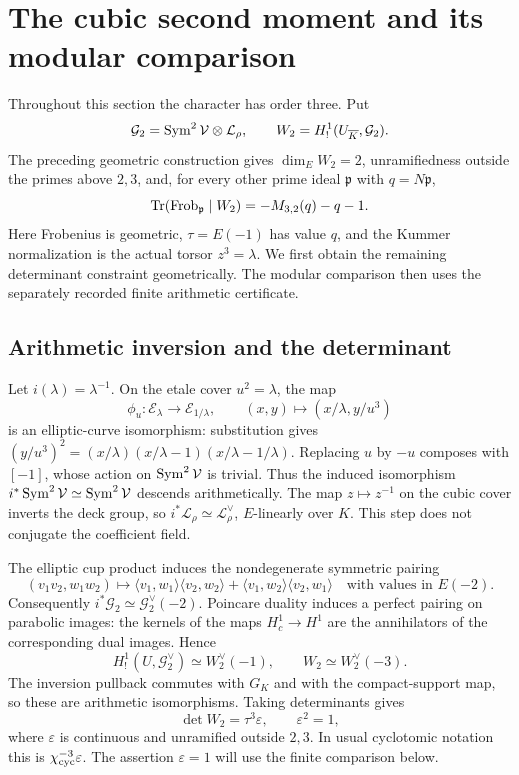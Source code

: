 \section{The cubic second moment and its modular comparison}\label{sec:cubic}
Throughout this section the character has order three. Put
\[
 \mathcal G_2=\operatorname{Sym}^2\mathcal V\otimes\mathcal L_\rho,
 \qquad W_2=H^1_!(U_{\overline K},\mathcal G_2).
\]
The preceding geometric construction gives $\dim_EW_2=2$, unramifiedness
outside the primes above $2,3$, and, for every other prime ideal
$\mathfrak p$ with $q=N\mathfrak p$,
\begin{equation}\label{eq:cubic-trace}
 \operatorname{Tr}(\operatorname{Frob}_{\mathfrak p}\mid W_2)=-M_{3,2}(q)-q-1.
\end{equation}
Here Frobenius is geometric, $\tau=E(-1)$ has value $q$, and the Kummer
normalization is the actual torsor $z^3=\lambda$. We first obtain the
remaining determinant constraint geometrically. The modular comparison
then uses the separately recorded finite arithmetic certificate.

\subsection{Arithmetic inversion and the determinant}
Let $i(\lambda)=\lambda^{-1}$. On the etale cover $u^2=\lambda$, the map
\[
 \phi_u:\mathcal E_\lambda\longrightarrow\mathcal E_{1/\lambda},
 \qquad (x,y)\longmapsto (x/\lambda,y/u^3)
\]
is an elliptic-curve isomorphism: substitution gives
$(y/u^3)^2=(x/\lambda)(x/\lambda-1)(x/\lambda-1/\lambda)$.
Replacing $u$ by $-u$ composes with $[-1]$, whose action on
$\operatorname{Sym}^2\mathcal V$ is trivial. Thus the induced isomorphism
$i^*\operatorname{Sym}^2\mathcal V\simeq\operatorname{Sym}^2\mathcal V$ descends arithmetically.
The map $z\mapsto z^{-1}$ on the cubic cover inverts the deck group,
so $i^*\mathcal L_\rho\simeq\mathcal L_\rho^\vee$, $E$-linearly over $K$.
This step does not conjugate the coefficient field.

The elliptic cup product induces the nondegenerate symmetric pairing
\[
 (v_1v_2,w_1w_2)\longmapsto
 \langle v_1,w_1\rangle\langle v_2,w_2\rangle+
 \langle v_1,w_2\rangle\langle v_2,w_1\rangle
 \quad\text{with values in }E(-2).
\]
Consequently $i^*\mathcal G_2\simeq\mathcal G_2^\vee(-2)$.
Poincare duality \cite[Theorem 24.1]{Milne} induces a perfect pairing
on parabolic images: the kernels of the maps $H_c^1\to H^1$ are the
annihilators of the corresponding dual images. Hence
\[
 H^1_!(U,\mathcal G_2^\vee)\simeq W_2^\vee(-1),
 \qquad W_2\simeq W_2^\vee(-3).
\]
The inversion pullback commutes with $G_K$ and with the compact-support
map, so these are arithmetic isomorphisms. Taking determinants gives
\begin{equation}\label{eq:cubic-det-sign}
 \det W_2=\tau^3\varepsilon,\qquad \varepsilon^2=1,
\end{equation}
where $\varepsilon$ is continuous and unramified outside $2,3$.
In usual cyclotomic notation this is
$\chi_{\rm cyc}^{-3}\varepsilon$. The assertion
$\varepsilon=1$ will use the finite comparison below.

